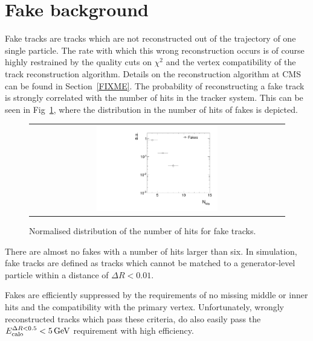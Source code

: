 \section{Fake background}
\label{sec:FakeBkg}
Fake tracks are tracks which are not reconstructed out of the trajectory of one single particle.
The rate with which this wrong reconstruction occurs is of course highly restrained by the quality cuts on $\chi^2$ and the vertex compatibility of the track reconstruction algorithm.
Details on the reconstruction algorithm at CMS can be found in Section~\ref{FIXME}.
The probability of reconstructing a fake track is strongly correlated with the number of hits in the tracker system.
This can be seen in Fig~\ref{fig:NValidFakes}, where the distribution in the number of hits of fakes is depicted.
\begin{figure}[!bt]
  \centering 
  \begin{tabular}{c}
    \includegraphics[width=0.49\textwidth]{figures/analysis/Background/NValidForFakes_chiTracksfullSelectionNoTriggerCuts.pdf}
  \end{tabular}
  \caption{Normalised distribution of the number of hits for fake tracks.}
  \label{fig:NValidFakes}
\end{figure}
There are almost no fakes with a number of hits larger than six.
In simulation, fake tracks are defined as tracks which cannot be matched to a generator-level particle within a distance of $\Delta R < 0.01$.

Fakes are efficiently suppressed by the requirements of no missing middle or inner hits and the compatibility with the primary vertex.
Unfortunately, wrongly reconstructed tracks which pass these criteria, do also easily pass the $E^{\Delta R<0.5}_{\text{calo}}<5\,\text{Ge}\kern-0.06667em\text{V}$ requirement with high efficiency.\\

